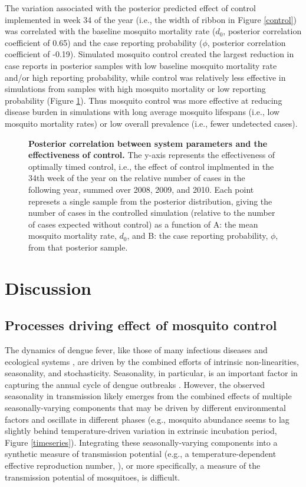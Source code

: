 \documentclass[10pt,letterpaper]{article}
\begin{document}
The variation associated with the posterior predicted effect of control implemented in week 34 of the year (i.e., the width of ribbon in Figure \ref{control}) was correlated with the baseline mosquito mortality rate ($d_0$, posterior correlation coefficient of 0.65) and the case reporting probability ($\phi$, posterior correlation coefficient of -0.19).
Simulated mosquito control created the largest reduction in case reports in posterior samples with low baseline mosquito mortality rate and/or high reporting probability, while control was relatively less effective in simulations from samples with high mosquito mortality or low reporting probability (Figure \ref{correlations}).
Thus mosquito control was more effective at reducing disease burden in simulations with long average mosquito lifespans (i.e., low mosquito mortality rates) or low overall prevalence (i.e., fewer undetected cases). 


\begin{figure}[!h]
\caption{{\bf Posterior correlation between system parameters and the effectiveness of control.}
The y-axis represents the effectiveness of optimally timed control, i.e., the effect of control implmented in the 34th week of the year on the relative number of cases in the following year, summed over 2008, 2009, and 2010.
Each point represets a single sample from the posterior distribution, giving the number of cases in the controlled simulation (relative to the number of cases expected without control) as a function of A: the mean mosquito mortality rate, $d_0$, and B: the case reporting probability, $\phi$, from that posterior sample.
}
\label{correlations}
\end{figure}

\section*{Discussion}

\subsection*{Processes driving effect of mosquito control}

The dynamics of dengue fever, like those of many infectious diseases \cite{Ellner1998,Koelle2004} and ecological systems \cite{Bjornstad2001}, are driven by the combined efforts of intrinsic non-linearities, seasonality, and stochasticity.
Seasonality, in particular, is an important factor in capturing the annual cycle of dengue outbreaks \cite{Wearing2006,Aguiar2011,Reich2013}.
However, the observed seasonality in transmission likely emerges from the combined effects of multiple seasonally-varying components that may be driven by different environmental factors and oscillate in different phases (e.g., mosquito abundance seems to lag slightly behind temperature-driven variation in extrinsic incubation period, Figure \ref{timeseries}).
Integrating these seasonally-varying components into a synthetic measure of transmission potential (e.g., a temperature-dependent effective reproduction number, \cite{Codeco2018}), or more specifically, a measure of the transmission potential of mosquitoes, is difficult.
\end{document}

